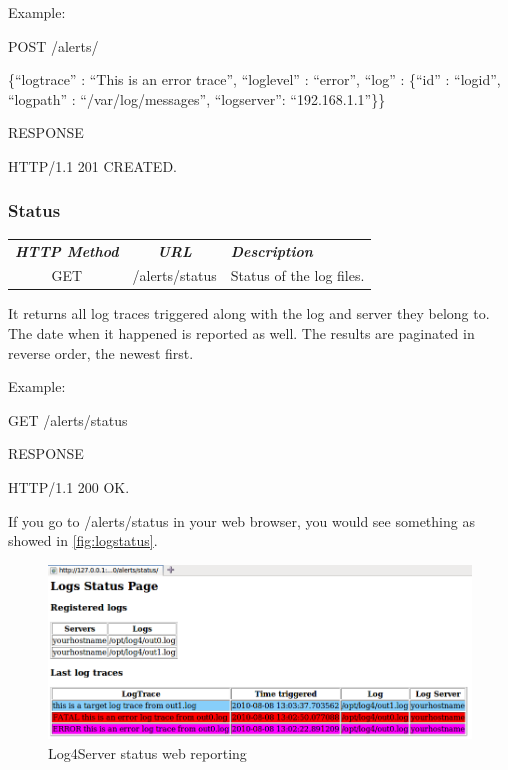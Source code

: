 \noindent
Example:

\begin{codeexample}

POST /alerts/

 \{``logtrace'' : ``This is an error trace'', 
   ``loglevel'' : ``error'',
   ``log'' : \{``id'' : ``logid'', ``logpath'' : ``/var/log/messages'', ``logserver'': 
``192.168.1.1''\}\} 

RESPONSE

HTTP/1.1 201 CREATED.
\end{codeexample}

\subsubsection{Status}

\begin{flushleft}
 \begin{tabular}{|c|c|l|}
 \hline 
 \rowcolor{cyan} {\color{white} \textit{\textbf{HTTP Method}}} &  {\color{white} 
  \textit{\textbf{URL}}}  & {\color{white} 
 \textit{\textbf{Description}}}\\
 GET & /alerts/status & Status of the log files.\\
 \hline
\end{tabular}
\end{flushleft}
It returns all log traces triggered along with the log and server they belong to. The 
date when it happened is reported as well. The results are paginated in reverse
order, the newest first.

\noindent
Example:

\begin{codeexample}

GET /alerts/status

RESPONSE

HTTP/1.1 200 OK.
\end{codeexample}


\noindent
If you go to /alerts/status in your web browser, you would see something as showed in  
\autoref{fig:logstatus}.

\begin{figure}[ht]
\includegraphics[scale=0.50]{logstatus.png}
\caption{Log4Server status web reporting}\label{fig:logstatus}
\end{figure}

